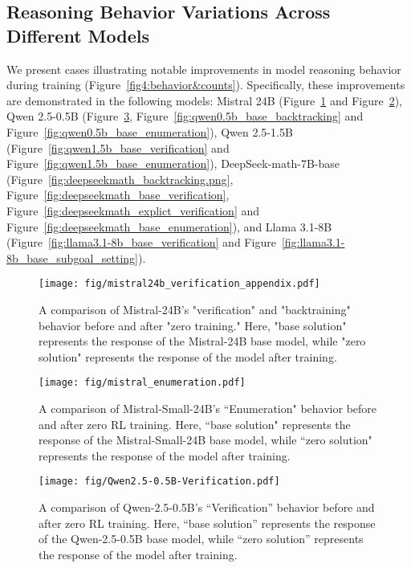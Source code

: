 \subsection{Reasoning Behavior Variations Across Different Models}

\label{sec:other_model_behaviour}

We present cases illustrating notable improvements in model reasoning behavior during training (Figure~\ref{fig4:behavior&counts}). Specifically, these improvements are demonstrated in the following models: Mistral 24B (Figure~\ref{fig7:verfication_case} and Figure~\ref{fig8:enumeration_case}), Qwen 2.5-0.5B (Figure~\ref{fig:qwen0.5b_base_verification}, Figure~\ref{fig:qwen0.5b_base_backtracking} and Figure~\ref{fig:qwen0.5b_base_enumeration}), Qwen 2.5-1.5B (Figure~\ref{fig:qwen1.5b_base_verification} and Figure~\ref{fig:qwen1.5b_base_enumeration}), DeepSeek-math-7B-base (Figure~\ref{fig:deepseekmath_backtracking.png}, Figure~\ref{fig:deepseekmath_base_verification}, Figure~\ref{fig:deepseekmath_explict_verification} and Figure~\ref{fig:deepseekmath_base_enumeration}), and Llama 3.1-8B (Figure~\ref{fig:llama3.1-8b_base_verification} and Figure~\ref{fig:llama3.1-8b_base_subgoal_setting}).


\begin{figure}[!t]
        \centering
\texttt{[image: fig/mistral24b\_verification\_appendix.pdf]}\vspace{-10pt}
\caption{A comparison of Mistral-24B's "verification" and "backtraining" behavior before and after "zero training." Here, "base solution" represents the response of the Mistral-24B base model, while "zero solution" represents the response of the model after training.
        }
        \label{fig7:verfication_case}
    \vspace{-10pt}
\end{figure}


\begin{figure}[!t]
        \centering
\texttt{[image: fig/mistral\_enumeration.pdf]}
\caption{A comparison of Mistral-Small-24B's ``Enumeration" behavior before and after zero RL training. Here, ``base solution" represents the response of the Mistral-Small-24B base model, while ``zero solution" represents the response of the model after training.
        }
        \label{fig8:enumeration_case}
    \vspace{-10pt}
\end{figure}


\begin{figure}[!t]
        \centering
\texttt{[image: fig/Qwen2.5-0.5B-Verification.pdf]}
\caption{A comparison of Qwen-2.5-0.5B’s ``Verification'' behavior before and after zero RL training. Here, ``base solution'' represents the response of the Qwen-2.5-0.5B base model,
while ``zero solution'' represents the response of the model after training.}
        \label{fig:qwen0.5b_base_verification}
\end{figure}


